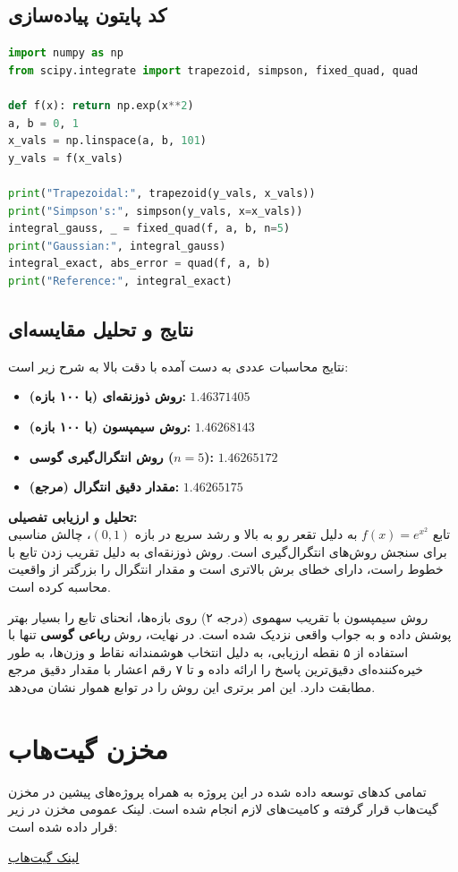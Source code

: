 \documentclass[a4paper,12pt]{article}
\begin{document}
\subsection{کد پایتون پیاده‌سازی}
\begin{latin}
\begin{lstlisting}[language=Python]
import numpy as np
from scipy.integrate import trapezoid, simpson, fixed_quad, quad

def f(x): return np.exp(x**2)
a, b = 0, 1
x_vals = np.linspace(a, b, 101)
y_vals = f(x_vals)

print("Trapezoidal:", trapezoid(y_vals, x_vals))
print("Simpson's:", simpson(y_vals, x=x_vals))
integral_gauss, _ = fixed_quad(f, a, b, n=5)
print("Gaussian:", integral_gauss)
integral_exact, abs_error = quad(f, a, b)
print("Reference:", integral_exact)
\end{lstlisting}
\end{latin}

\subsection{نتایج و تحلیل مقایسه‌ای}
نتایج محاسبات عددی به دست آمده با دقت بالا به شرح زیر است:
\begin{itemize}
    \item \textbf{روش ذوزنقه‌ای (با ۱۰۰ بازه):} $1.46371405$
    \item \textbf{روش سیمپسون (با ۱۰۰ بازه):} $1.46268143$
    \item \textbf{روش انتگرال‌گیری گوسی ($n=5$):} $1.46265172$
    \item \textbf{مقدار دقیق انتگرال (مرجع):} $1.46265175$
\end{itemize}

\textbf{تحلیل و ارزیابی تفصیلی:} \\
تابع $f(x) = e^{x^2}$ به دلیل تقعر رو به بالا و رشد سریع در بازه $(0,1)$، چالش مناسبی برای سنجش روش‌های انتگرال‌گیری است. روش ذوزنقه‌ای به دلیل تقریب زدن تابع با خطوط راست، دارای خطای برش بالاتری است و مقدار انتگرال را بزرگتر از واقعیت محاسبه کرده است. 

روش سیمپسون با تقریب سهموی (درجه ۲) روی بازه‌ها، انحنای تابع را بسیار بهتر پوشش داده و به جواب واقعی نزدیک شده است. در نهایت، روش \textbf{رباعی گوسی} تنها با استفاده از ۵ نقطه ارزیابی، به دلیل انتخاب هوشمندانه نقاط و وزن‌ها، به طور خیره‌کننده‌ای دقیق‌ترین پاسخ را ارائه داده و تا ۷ رقم اعشار با مقدار دقیق مرجع مطابقت دارد. این امر برتری این روش را در توابع هموار نشان می‌دهد.

\section{مخزن گیت‌هاب}
تمامی کدهای توسعه داده شده در این پروژه به همراه پروژه‌های پیشین در مخزن گیت‌هاب قرار گرفته و کامیت‌های لازم انجام شده است. لینک عمومی مخزن در زیر قرار داده شده است:

\vspace{0.5cm}
\noindent
\href{https://github.com/iamsaad03/MathSoftwareProjects.git}{لینک گیت‌هاب}
\end{document}

